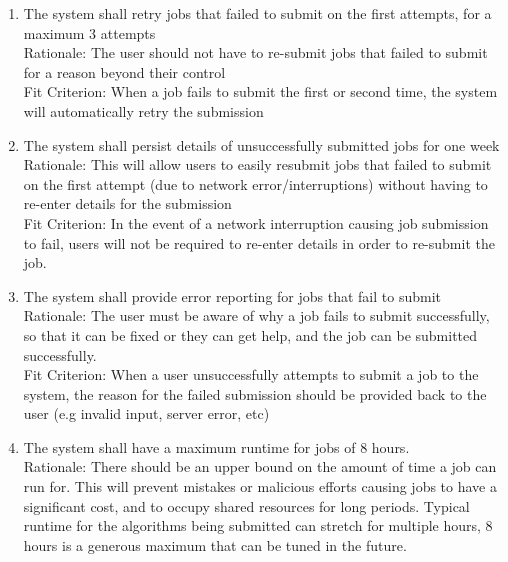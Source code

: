 \documentclass{article}
\begin{document}
\begin{enumerate}[label=\textbf{SR-\arabic*:}]{\leftmargin=1em \itemindent=0em}
    \item 
    The system shall retry jobs that failed to submit on the first attempts, for a maximum 3 attempts \\
    \newline Rationale: The user should not have to re-submit jobs that failed to submit for a reason beyond their control\\
    \newline Fit Criterion: When a job fails to submit the first or second time, the system will automatically retry the submission
    \item The system shall persist details of unsuccessfully submitted jobs for one week\\
    \newline Rationale: This will allow users to easily resubmit jobs that failed to submit on the first attempt (due to network error/interruptions) without having to re-enter details for the submission \\
    \newline Fit Criterion: In the event of a network interruption causing job submission to fail, users will not be required to re-enter details in order to re-submit the job.
    \item The system shall provide error reporting for jobs that fail to submit \\
    \newline Rationale: The user must be aware of why a job fails to submit successfully, so that it can be fixed or they can get help, and the job can be submitted successfully. \\
    \newline Fit Criterion:  When a user unsuccessfully attempts to submit a job to the system, the reason for the failed submission should be provided back to the user (e.g invalid input, server error, etc)
    \item The system shall have a maximum runtime for jobs of 8 hours. \\
    \newline Rationale: There should be an upper bound on the amount of time a job can run for. This will prevent mistakes or malicious efforts causing jobs to have a significant cost, and to occupy shared resources for long periods. Typical runtime for the algorithms being submitted can stretch for multiple hours, 8 hours is a generous maximum that can be tuned in the future. \\

\end{enumerate}
\end{document}
